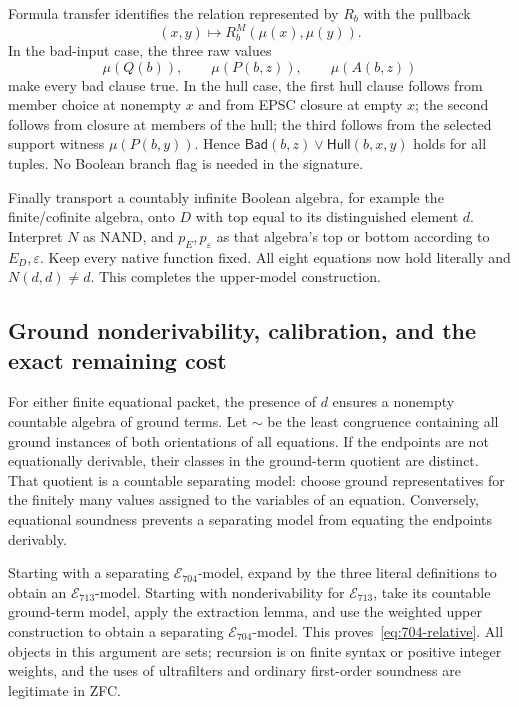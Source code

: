 Formula transfer identifies the relation represented by $R_b$ with the pullback
\[
 (x,y)\longmapsto R_b^M(\mu(x),\mu(y)).
\]
In the bad-input case, the three raw values
\[
 \mu(Q(b)),\qquad\mu(P(b,z)),\qquad\mu(A(b,z))
\]
make every bad clause true.
In the hull case, the first hull clause follows from member choice at
nonempty $x$ and from EPSC closure at empty $x$; the second follows
from closure at members of the hull; the third follows from the
selected support witness $\mu(P(b,y))$.  Hence
$\mathsf{Bad}(b,z)\lor\mathsf{Hull}(b,x,y)$ holds for all tuples.
No Boolean branch flag is needed in the signature.

Finally transport a countably infinite Boolean algebra, for example
the finite/cofinite algebra, onto $D$ with top equal to its distinguished
element $d$.  Interpret $N$ as NAND, and $p_E,p_\varepsilon$ as that
algebra's top or bottom according to $E_D,\varepsilon$.  Keep every
native function fixed.  All eight equations now hold literally and
$N(d,d)\ne d$.  This completes the upper-model construction.

\subsection{Ground nonderivability, calibration, and the exact remaining cost}

For either finite equational packet, the presence of $d$ ensures a
nonempty countable algebra of ground terms.  Let $\sim$ be the least
congruence containing all ground instances of both orientations of all
equations.  If the endpoints are not equationally derivable, their
classes in the ground-term quotient are distinct.  That quotient is
a countable separating model: choose ground representatives for the
finitely many values assigned to the variables of an equation.
Conversely, equational soundness prevents a separating model from
equating the endpoints derivably.

Starting with a separating $\mathcal E_{704}$-model, expand by
the three literal definitions to obtain an $\mathcal E_{713}$-model.
Starting with nonderivability for $\mathcal E_{713}$, take its
countable ground-term model, apply the extraction lemma, and use
the weighted upper construction to obtain a separating
$\mathcal E_{704}$-model.  This proves~\eqref{eq:704-relative}.
All objects in this argument are sets; recursion is on finite syntax
or positive integer weights, and the uses of ultrafilters and ordinary
first-order soundness are legitimate in ZFC.

